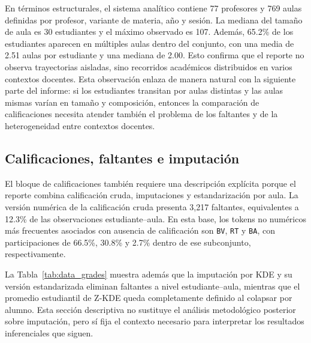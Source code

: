 \documentclass[8pt,a4paper]{article} %
\numberwithin{figure}{subsection}
\begin{document}
En términos estructurales, el sistema analítico contiene 77 profesores y 769 aulas definidas por profesor, variante de materia, año y sesión. La mediana del tamaño de aula es 30 estudiantes y el máximo observado es 107. Además, 65.2\% de los estudiantes aparecen en múltiples aulas dentro del conjunto, con una media de 2.51 aulas por estudiante y una mediana de 2.00. Esto confirma que el reporte no observa trayectorias aisladas, sino recorridos académicos distribuidos en varios contextos docentes. Esta observación enlaza de manera natural con la siguiente parte del informe: si los estudiantes transitan por aulas distintas y las aulas mismas varían en tamaño y composición, entonces la comparación de calificaciones necesita atender también el problema de los faltantes y de la heterogeneidad entre contextos docentes.

\subsection{Calificaciones, faltantes e imputación}
El bloque de calificaciones también requiere una descripción explícita porque el reporte combina calificación cruda, imputaciones y estandarización por aula. La versión numérica de la calificación cruda presenta 3{,}217 faltantes, equivalentes a 12.3\% de las observaciones estudiante--aula. En esta base, los tokens no numéricos más frecuentes asociados con ausencia de calificación son \texttt{BV}, \texttt{RT} y \texttt{BA}, con participaciones de 66.5\%, 30.8\% y 2.7\% dentro de ese subconjunto, respectivamente.

\begin{table}[!htbp]
    \centering
    \small
    \caption{Resumen de variables de calificación utilizadas en el pipeline analítico.}
    \label{tab:data_grades}
    \resizebox{\textwidth}{!}{}
\end{table}

\begin{table}[!htbp]
    \centering
    \small
    \caption{Tokens no numéricos observados en la calificación cruda.}
    \label{tab:data_grade_tokens}
    \resizebox{0.5\textwidth}{!}{}
\end{table}

La Tabla~\ref{tab:data_grades} muestra además que la imputación por KDE y su versión estandarizada eliminan faltantes a nivel estudiante--aula, mientras que el promedio estudiantil de Z-KDE queda completamente definido al colapsar por alumno. Esta sección descriptiva no sustituye el análisis metodológico posterior sobre imputación, pero sí fija el contexto necesario para interpretar los resultados inferenciales que siguen.
\end{document}
